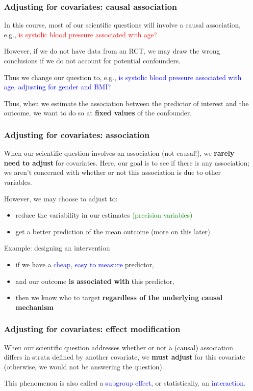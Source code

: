 \documentclass[12pt, 
hyperref={colorlinks=true, linkcolor=blue, urlcolor=cyan},dvipsnames]{beamer}
\begin{document}
\begin{frame}
\frametitle{Adjusting for covariates: causal association}

In this course, most of our scientific questions will involve a causal association, e.g., \textcolor{red}{is systolic blood pressure associated with age?}

However, if we do not have data from an RCT, we may draw the wrong conclusions if we do not account for potential confounders. 

Thus we change our question to, e.g., \textcolor{blue}{is systolic blood pressure associated with age, adjusting for gender and BMI?}

Thus, when we estimate the association between the predictor of interest and the outcome, we want to do so at \textbf{fixed values} of the confounder.
\end{frame}

\begin{frame}
\frametitle{Adjusting for covariates: association}
When our scientific question involves an association (not causal!), we \textbf{rarely need to adjust} for covariates. Here, our goal is to see if there is any association; we aren't concerned with whether or not this association is due to other variables. 

However, we may choose to adjust to: \vspace{-0.3cm}
\begin{itemize}
\item reduce the variability in our estimates \textcolor{green}{(precision variables)}
\item get a better prediction of the mean outcome (more on this later)
\end{itemize}

Example: designing an intervention \vspace{-0.3cm}
\begin{itemize}
\item if we have a \textcolor{blue}{cheap, easy to measure} predictor, 
\item and our outcome \textbf{is associated with} this predictor,
\item then we know who to target \textbf{regardless of the underlying causal mechanism}
\end{itemize}
\end{frame}

\begin{frame}
\frametitle{Adjusting for covariates: effect modification}

When our scientific question addresses whether or not a (causal) association differs in strata defined by another covariate, we \textbf{must adjust} for this covariate (otherwise, we would not be answering the question).

This phenomenon is also called a \textcolor{blue}{subgroup effect}, or statistically, an \textcolor{blue}{interaction}.

\end{frame}
\end{document}
